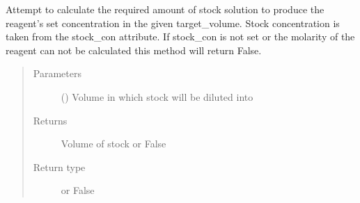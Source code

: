 \documentclass[letterpaper,10pt,english]{sphinxmanual}
\begin{document}
\begin{fulllineitems}
\begin{fulllineitems}
\label{\detokenize{polo.crystallography:polo.crystallography.cocktail.Reagent.stock_volume}}
Attempt to calculate the required amount of stock solution to
produce the reagent’s set concentration in the given target\_volume.
Stock concentration is taken from the stock\_con attribute. If
stock\_con is not set or the molarity of the reagent can not be
calculated this method will return False.
\begin{quote}\begin{description}
\item[{Parameters}] \leavevmode
{} ({\hyperref[\detokenize{polo.crystallography:polo.crystallography.cocktail.SignedValue}]{}}) \textendash{} Volume in which stock will be diluted into

\item[{Returns}] \leavevmode
Volume of stock or False

\item[{Return type}] \leavevmode
{\hyperref[\detokenize{polo.crystallography:polo.crystallography.cocktail.SignedValue}]{}} or False

\end{description}\end{quote}

\end{fulllineitems}


\begin{fulllineitems}
\label{\detokenize{polo.crystallography:polo.crystallography.cocktail.Reagent.units}}
\end{fulllineitems}


\end{fulllineitems}

\end{document}
